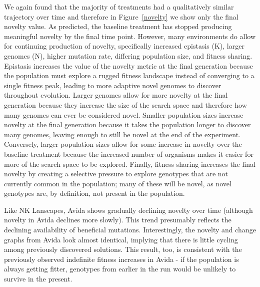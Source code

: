 \documentclass[letterpaper]{article}
\begin{document}
We again found that the majority of treatments had a qualitatively similar trajectory over time and therefore in Figure~\ref{novelty} we show only the final novelty value. As predicted, the baseline treatment has stopped producing meaningful novelty by the final time point. However, many environments do allow for continuing production of novelty, specifically increased epistasis (K), larger genomes (N), higher mutation rate, differing population size, and fitness sharing. Epistasis increases the value of the novelty metric at the final generation because the population must explore a rugged fitness landscape instead of converging to a single fitness peak, leading to more adaptive novel genomes to discover throughout evolution. Larger genomes allow for more novelty at the final generation because they increase the size of the search space and therefore how many genomes can ever be considered novel. Smaller population sizes increase novelty at the final generation because it takes the population longer to discover many genomes, leaving enough to still be novel at the end of the experiment. Conversely, larger population sizes allow for some increase in novelty over the baseline treatment because the increased number of organisms makes it easier for more of the search space to be explored. Finally, fitness sharing increases the final novelty by creating a selective pressure to explore genotypes that are not currently common in the population; many of these will be novel, as novel genotypes are, by definition, not present in the population.

Like NK Lanscapes, Avida shows gradually declining novelty over time (although novelty in Avida declines more slowly). This trend presumably reflects the declining availability of beneficial mutations. Interestingly, the novelty and change graphs from Avida look almost identical, implying that there is little cycling among previously discovered solutions. This result, too, is consistent with the previously observed indefinite fitness increases in Avida \citep{wiser_analysis_2015} - if the population is always getting fitter, genotypes from earlier in the run would be unlikely to survive in the present.
\end{document}
